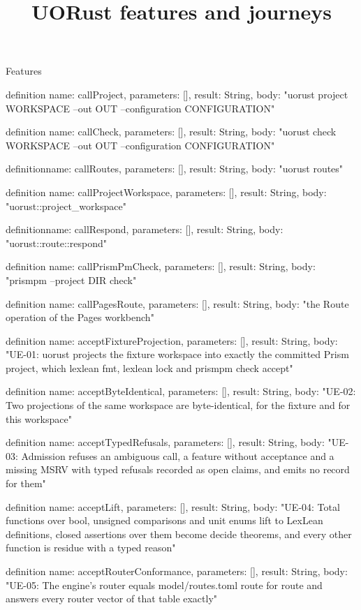 \begin{lexlean}{Features}
\title{UORust features and journeys}
\begin{semanticmodule}
definition{
  name: callProject,
  parameters: [],
  result: String,
  body: "uorust project WORKSPACE --out OUT --configuration CONFIGURATION"
}

definition{
  name: callCheck,
  parameters: [],
  result: String,
  body: "uorust check WORKSPACE --out OUT --configuration CONFIGURATION"
}

definition{name: callRoutes, parameters: [], result: String, body: "uorust routes"}

definition{
  name: callProjectWorkspace,
  parameters: [],
  result: String,
  body: "uorust::project_workspace"
}

definition{name: callRespond, parameters: [], result: String, body: "uorust::route::respond"}

definition{
  name: callPrismPmCheck,
  parameters: [],
  result: String,
  body: "prismpm --project DIR check"
}

definition{
  name: callPagesRoute,
  parameters: [],
  result: String,
  body: "the Route operation of the Pages workbench"
}

definition{
  name: acceptFixtureProjection,
  parameters: [],
  result: String,
  body: "UE-01: uorust projects the fixture workspace into exactly the committed Prism project, which lexlean fmt, lexlean lock and prismpm check accept"
}

definition{
  name: acceptByteIdentical,
  parameters: [],
  result: String,
  body: "UE-02: Two projections of the same workspace are byte-identical, for the fixture and for this workspace"
}

definition{
  name: acceptTypedRefusals,
  parameters: [],
  result: String,
  body: "UE-03: Admission refuses an ambiguous call, a feature without acceptance and a missing MSRV with typed refusals recorded as open claims, and emits no record for them"
}

definition{
  name: acceptLift,
  parameters: [],
  result: String,
  body: "UE-04: Total functions over bool, unsigned comparisons and unit enums lift to LexLean definitions, closed assertions over them become decide theorems, and every other function is residue with a typed reason"
}

definition{
  name: acceptRouterConformance,
  parameters: [],
  result: String,
  body: "UE-05: The engine's router equals model/routes.toml route for route and answers every router vector of that table exactly"
}


\end{semanticmodule}
\end{lexlean}
